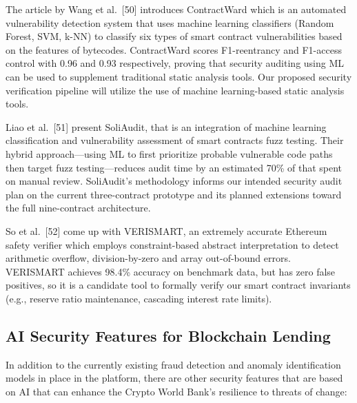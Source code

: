 \documentclass[12pt,a4paper]{report}
\begin{document}
The article by Wang et al.~[50] introduces ContractWard which is an automated vulnerability detection system that uses machine learning classifiers (Random Forest, SVM, k-NN) to classify six types of smart contract vulnerabilities based on the features of bytecodes. ContractWard scores F1-reentrancy and F1-access control with 0.96 and 0.93 respectively, proving that security auditing using ML can be used to supplement traditional static analysis tools. Our proposed security verification pipeline will utilize the use of machine learning-based static analysis tools.

Liao et al.~[51] present SoliAudit, that is an integration of machine learning classification and vulnerability assessment of smart contracts fuzz testing. Their hybrid approach---using ML to first prioritize probable vulnerable code paths then target fuzz testing---reduces audit time by an estimated 70\% of that spent on manual review. SoliAudit's methodology informs our intended security audit plan on the current three-contract prototype and its planned extensions toward the full nine-contract architecture.

So et al.~[52] come up with VERISMART, an extremely accurate Ethereum safety verifier which employs constraint-based abstract interpretation to detect arithmetic overflow, division-by-zero and array out-of-bound errors. VERISMART achieves 98.4\% accuracy on benchmark data, but has zero false positives, so it is a candidate tool to formally verify our smart contract invariants (e.g., reserve ratio maintenance, cascading interest rate limits).

\subsection{AI Security Features for Blockchain Lending}

In addition to the currently existing fraud detection and anomaly identification models in place in the platform, there are other security features that are based on AI that can enhance the Crypto World Bank's resilience to threats of change:
\end{document}
